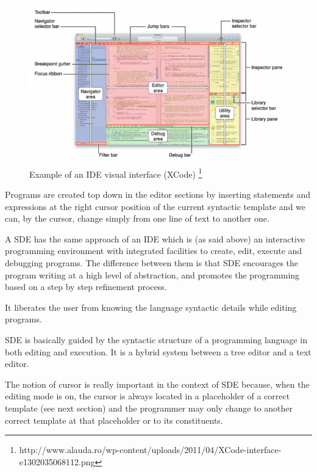 \documentclass[
  oneside,
  11pt, a4paper,
  footinclude=true,
  headinclude=true,
  cleardoublepage=empty
]{scrbook}
\begin{document}
\begin{figure}[h!]
  \centering
    \includegraphics[width=1\textwidth]{img/XCode-interface.png}
    \caption{Example of an IDE visual interface (XCode) \protect\footnote{http://www.alauda.ro/wp-content/uploads/2011/04/XCode-interface-e1302035068112.png}}
    \label{fig:ideXCode}
\end{figure}

\newpage

Programs are created top down in the editor sections by inserting statements and expressions at the right cursor position of the current syntactic template and we can, by the cursor, change simply from one line of text to another one.

A SDE has the same approach of an IDE which is (as said above) an interactive programming environment with integrated facilities to create, edit, execute and debugging programs.
The difference between them is that SDE encourages the program writing at a high level of abstraction, and promotes the programming based on a step by step refinement process.

It liberates the user from knowing the language syntactic details while editing programs.

SDE is basically guided by the syntactic structure of a programming language in both editing and execution. It is a hybrid system between a tree editor and a text editor.

The notion of cursor is really important in the context of SDE because, when the editing mode is on, the cursor is always located in a placeholder of a correct template (see next section) and the programmer may only change to another correct template at that placeholder or to its constituents.%
\end{document}
